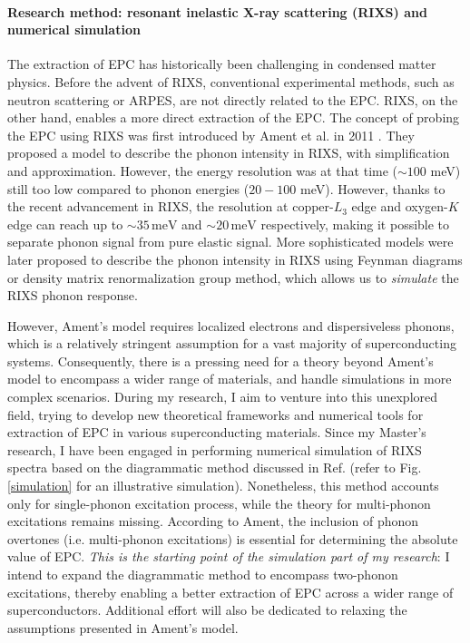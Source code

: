 \documentclass[11pt]{article}
\begin{document}
\paragraph{Research method: resonant inelastic X-ray scattering (RIXS) and numerical simulation}
The extraction of EPC has historically been challenging in condensed matter physics. 
Before the advent of RIXS, conventional experimental methods, such as neutron scattering or ARPES, are not directly related to the EPC. 
RIXS, on the other hand, enables a more direct extraction of the EPC. 
The concept of probing the EPC using RIXS was first introduced by Ament et al. in 2011 \cite{ament_resonant_2011}. They proposed a model to describe the phonon intensity in RIXS, with simplification and approximation.
However, the energy resolution was at that time ($\sim100$ meV) still too low compared to phonon energies ($20-100$ meV). 
However, thanks to the recent advancement in RIXS\cite{zhou_i21_2022,brookes_the_2018}, the resolution at copper-$L_3$ edge and oxygen-$K$ edge can reach up to $\sim 35\,\mathrm{meV}$ and $\sim 20\,\mathrm{meV}$ respectively, making it possible to separate phonon signal from pure elastic signal. 
More sophisticated models were later proposed to describe the phonon intensity in RIXS using Feynman diagrams \cite{devereaux_directly_2016,matsubayashi_numerical_2023,bieniasz_theory_2022,geondzhian_generalization_2020} or density matrix renormalization group method\cite{nocera_computing_2018}, which allows us to \textit{simulate} the RIXS phonon response.

However, Ament's model requires localized electrons and dispersiveless phonons, which is a relatively stringent assumption for a vast majority of superconducting systems. 
Consequently, there is a pressing need for a theory beyond Ament's model to encompass a wider range of materials, and handle simulations in more complex scenarios. 
{During my research, I aim to venture into this unexplored field, trying to develop new theoretical frameworks and numerical tools for extraction of EPC in various superconducting materials.} 
Since my Master's research, I have been engaged in performing numerical simulation of RIXS spectra based on the diagrammatic method discussed in Ref.\cite{devereaux_directly_2016} (refer to Fig.\ref{simulation} for an illustrative simulation). 
Nonetheless, this method accounts only for single-phonon excitation process, while the theory for multi-phonon excitations remains missing.
According to Ament\cite{ament_determining_2011}, the inclusion of phonon overtones (i.e. multi-phonon excitations) is essential for determining the absolute value of EPC. 
\textit{This is the starting point of the simulation part of my research}: I intend to expand the diagrammatic method to encompass two-phonon excitations, thereby enabling a better extraction of EPC across a wider range of superconductors. 
Additional effort will also be dedicated to relaxing the assumptions presented in Ament's model.
\end{document}

